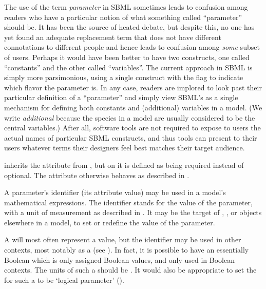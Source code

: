 The use of the term \emph{parameter} in SBML sometimes leads to
confusion among readers who have a particular notion of what
something called ``parameter'' should be.  It has been the source
of heated debate, but despite this, no one has yet found an
adequate replacement term that does not have different
connotations to different people and hence leads to confusion
among \emph{some} subset of users.  Perhaps it would have been
better to have two constructs, one called ``constants'' and the
other called ``variables''.  The current approach in SBML is
simply more parsimonious, using a single \Parameter construct with
the  flag  to indicate which flavor the
parameter is.  In any case, readers are implored to look past
their particular definition of a ``parameter'' and simply view
SBML's \Parameter as a single mechanism for defining both
constants and (additional) variables in a model.  (We write
\emph{additional} because the species in a model are usually
considered to be the central variables.)  After all, software
tools are not required to expose to users the actual names of
particular SBML constructs, and thus tools can present to their
users whatever terms their designers feel best matches their
target audience.



\begin{blockChanged}
\Parameter inherits the  attribute from \SBase, but on \Parameter it is defined as being required instead of optional.  The attribute otherwise behaves as described in .

A parameter's identifier (its  attribute value) may be used in a model's mathematical expressions.  The identifier stands for the value of the parameter, with a unit of measurement as described in .  It may be the target of \InitialAssignment, \EventAssignment, or \Rule objects elsewhere in a model, to set or redefine the value of the parameter.

A \Parameter {} will most often represent a  value, but the identifier may be used in other contexts, most notably as a  (see ).  In fact, it is possible to have an essentially Boolean \Parameter which is only assigned Boolean values, and only used in Boolean contexts.  The units of such a \Parameter should be .  It would also be appropriate to set the  for such a \Parameter to be `logical parameter' ().
\end{blockChanged}


